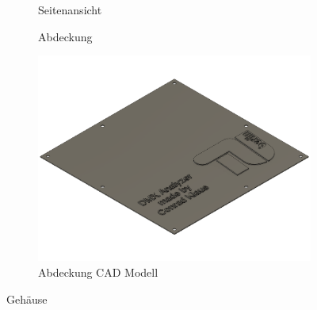\begin{figure}[H]
	\centering
	\begin{subfigure}{.32\textwidth}
		\centering
		\caption{Seitenansicht}
	\end{subfigure}
	\begin{subfigure}{.32\textwidth}
		\centering
		\caption{Abdeckung}
	\end{subfigure}
	\begin{subfigure}{.32\textwidth}
		\centering
		\includegraphics[width=\linewidth]{Pictures/DmxCaseLid}
		\caption{Abdeckung CAD Modell}
		\label{DmxCaseLidRender}
	\end{subfigure}
	\caption{Gehäuse}
	\label{fig:DmxCase}
\end{figure}

